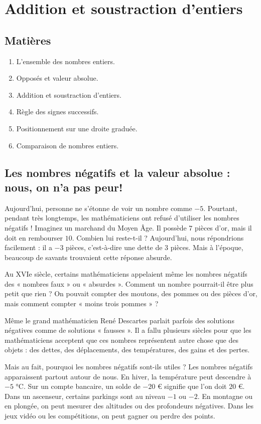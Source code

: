 \documentclass[../../syllabus_1.tex]{subfiles}
\begin{document}
\chapter{Addition et soustraction d'entiers}

\section*{Matières}
\begin{enumerate}[label=\textbf{\arabic*.}]
    \item L'ensemble des nombres entiers.
    \item Opposés et valeur absolue.
    \item Addition et soustraction d'entiers.
    \item Règle des signes successifs.
    \item Positionnement sur une droite graduée.
    \item Comparaison de nombres entiers.
\end{enumerate}

\section{Les nombres négatifs et la valeur absolue : nous, on n'a pas peur!}
Aujourd'hui, personne ne s'étonne de voir un nombre comme \(-5 \). Pourtant, pendant très longtemps, les mathématiciens ont refusé d'utiliser les nombres négatifs ! Imaginez un marchand du Moyen Âge. Il possède \(7\) pièces d'or, mais il doit en rembourser \(10\). Combien lui reste-t-il ? Aujourd'hui, nous répondrions facilement : il a \(-3\) pièces, c'est-à-dire une dette de \(3\) pièces. Mais à l'époque, beaucoup de savants trouvaient cette réponse absurde.

Au XVIe siècle, certains mathématiciens appelaient même les nombres négatifs des « nombres faux » ou « absurdes ». Comment un nombre pourrait-il être plus petit que rien ? On pouvait compter des moutons, des pommes ou des pièces d'or, mais comment compter « moins trois pommes » ?

Même le grand mathématicien René Descartes parlait parfois des solutions négatives comme de solutions « fausses ». Il a fallu plusieurs siècles pour que les mathématiciens acceptent que ces nombres représentent autre chose que des objets : des dettes, des déplacements, des températures, des gains et des pertes.

Mais au fait, pourquoi les nombres négatifs sont-ils utiles ? Les nombres négatifs apparaissent partout autour de nous.
En hiver, la température peut descendre à \(-5\) °C.
Sur un compte bancaire, un solde de \(-20\) € signifie que l'on doit \(20\) €.
Dans un ascenseur, certains parkings sont au niveau \(-1\) ou \(-2\).
En montagne ou en plongée, on peut mesurer des altitudes ou des profondeurs négatives.
Dans les jeux vidéo ou les compétitions, on peut gagner ou perdre des points.
\end{document}

